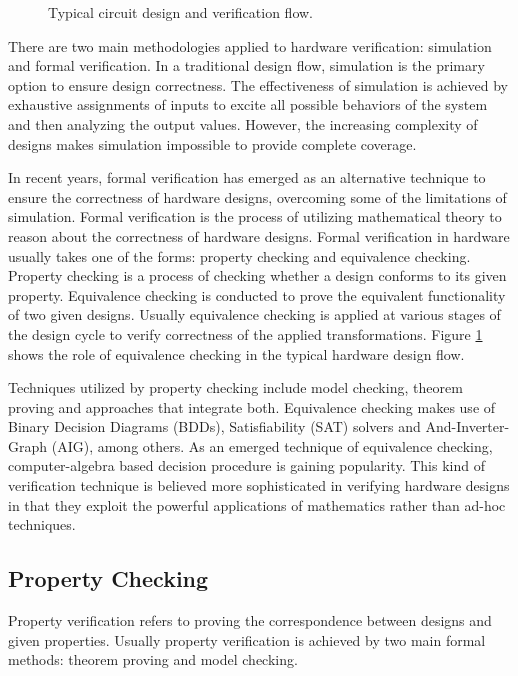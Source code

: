 {\epsfxsize=3.5in
\begin{figure}[ht]
\centerline{
}
\caption{Typical circuit design and verification flow.}
\label{fig:cadflow}
\end{figure}
}

There are two main methodologies applied to hardware verification: simulation and formal verification.
In a traditional design flow, simulation is the primary option to ensure design correctness. 
The effectiveness of simulation is achieved by exhaustive assignments of inputs to excite all possible behaviors of
the system and then analyzing the output values.
However, the increasing complexity of designs makes simulation impossible to provide complete coverage.

In recent years, formal verification has emerged as an alternative technique to ensure the
correctness of hardware designs, overcoming some of the limitations of simulation.
Formal verification is the process of utilizing mathematical theory to reason about the correctness of hardware designs.
Formal verification in hardware usually takes one of the forms: property checking and equivalence checking.
Property checking is a process of checking whether a design conforms to its given property.
Equivalence checking is conducted to prove the equivalent functionality of two given designs.
Usually equivalence checking is applied at various stages of the design cycle to verify correctness of the applied transformations.
Figure \ref{fig:cadflow} shows the role of equivalence checking in the typical hardware design flow.

Techniques utilized by property checking include model checking, theorem proving and approaches that integrate both. 
Equivalence checking makes use of Binary Decision Diagrams (BDDs), Satisfiability (SAT) solvers and And-Inverter-Graph (AIG), among others.
As an emerged technique of equivalence checking, computer-algebra based decision procedure is gaining popularity.
This kind of verification technique is believed more sophisticated in verifying hardware designs in that they exploit the 
powerful applications of mathematics rather than ad-hoc techniques.


\subsection{Property Checking}
Property verification refers to proving the correspondence between designs and given properties.
Usually property verification is achieved by two main formal methods: theorem proving and model checking.  

